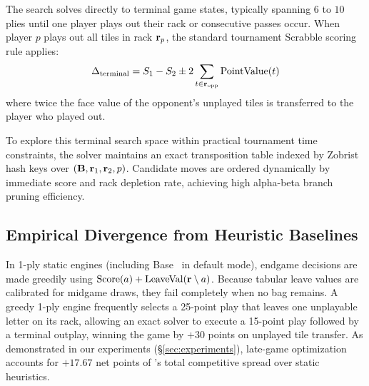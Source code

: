 The search solves directly to terminal game states, typically spanning $6$ to $10$ plies until one player plays out their rack or consecutive passes occur. When player $p$ plays out all tiles in rack $\mathbf{r}_p$, the standard tournament Scrabble scoring rule applies:
\begin{equation}
    \label{eq:endgame_terminal}
    \Delta_{\mathrm{terminal}} = S_1 - S_2 \pm 2 \sum_{t \in \mathbf{r}_{\mathrm{opp}}} \mathrm{PointValue}(t)
\end{equation}
where twice the face value of the opponent's unplayed tiles is transferred to the player who played out.

To explore this terminal search space within practical tournament time constraints, the solver maintains an exact transposition table indexed by Zobrist hash keys over $(\mathbf{B}, \mathbf{r}_1, \mathbf{r}_2, p)$. Candidate moves are ordered dynamically by immediate score and rack depletion rate, achieving high alpha-beta branch pruning efficiency.

\subsection{Empirical Divergence from Heuristic Baselines}

In 1-ply static engines (including Base \magpie\ in default mode), endgame decisions are made greedily using $\mathrm{Score}(a) + \mathrm{LeaveVal}(\mathbf{r} \setminus a)$. Because tabular leave values are calibrated for midgame draws, they fail completely when no bag remains. A greedy 1-ply engine frequently selects a 25-point play that leaves one unplayable letter on its rack, allowing an exact solver to execute a 15-point play followed by a terminal outplay, winning the game by $+30$ points on unplayed tile transfer. As demonstrated in our experiments (\S\ref{sec:experiments}), late-game optimization accounts for $+17.67$ net points of \algo's total competitive spread over static heuristics.
